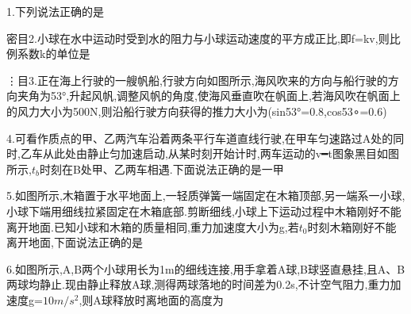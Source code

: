 \question[6] 1.下列说法正确的是
\begin{solution}{4cm}

\end{solution}



\question[6] 密目2.小球在水中运动时受到水的阻力与小球运动速度的平方成正比,即f=kv,则比例系数k的单位是
\begin{solution}{4cm}

\end{solution}



\question[6] ⋮目3.正在海上行驶的一艘帆船,行驶方向如图所示,海风吹来的方向与船行驶的方向夹角为53°,升起风帆,调整风帆的角度,使海风垂直吹在帆面上,若海风吹在帆面上的风力大小为500N,则沿船行驶方向获得的推力大小为(sin53°=0.8,cos53∘=0.6)
\begin{solution}{4cm}

\end{solution}



\question[6] 4.可看作质点的甲、乙两汽车沿着两条平行车道直线行驶,在甲车匀速路过A处的同时,乙车从此处由静止匀加速启动,从某时刻开始计时,两车运动的v━t图象黑目如图所示,$t_b$时刻在B处甲、乙两车相遇.下面说法正确的是一甲
\begin{solution}{4cm}

\end{solution}



\question[6] 5.如图所示,木箱置于水平地面上,一轻质弹簧一端固定在木箱顶部,另一端系一小球,小球下端用细线拉紧固定在木箱底部.剪断细线,小球上下运动过程中木箱刚好不能离开地面.已知小球和木箱的质量相同,重力加速度大小为g,若$t_0$时刻木箱刚好不能离开地面,下面说法正确的是

\begin{solution}{4cm}

\end{solution}



\question[6] 6.如图所示,A,B两个小球用长为1m的细线连接,用手拿着A球,B球竖直悬挂,且A、B两球均静止.现由静止释放A球,测得两球落地的时间差为0.2s,不计空气阻力,重力加速度g=$10m/s^2$,则A球释放时离地面的高度为
\begin{solution}{4cm}

\end{solution}



